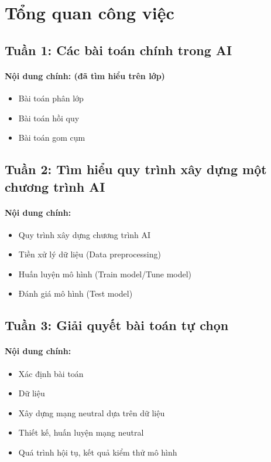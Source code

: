 \section{Tổng quan công việc}
\subsection{Tuần 1: Các bài toán chính trong AI}
\paragraph{Nội dung chính: (đã tìm hiểu trên lớp)}
\begin{itemize}
\item Bài toán phân lớp
\item Bài toán hồi quy
\item Bài toán gom cụm
\end{itemize}
\subsection{Tuần 2: Tìm hiểu quy trình xây dựng một chương trình AI}
\paragraph{Nội dung chính:}
\begin{itemize}
\item Quy trình xây dựng chương trình AI
\item Tiền xử lý dữ liệu (Data preprocessing)
\item Huấn luyện mô hình (Train model/Tune model)
\item Đánh giá mô hình (Test model)
\end{itemize}
\subsection{Tuần 3: Giải quyết bài toán tự chọn}
\paragraph{Nội dung chính:}
\begin{itemize}
\item Xác định bài toán
\item Dữ liệu
\item Xây dựng mạng neutral dựa trên dữ liệu
\item Thiết kế, huấn luyện mạng neutral
\item Quá trình hội tụ, kết quả kiểm thử mô hình
\end{itemize}






